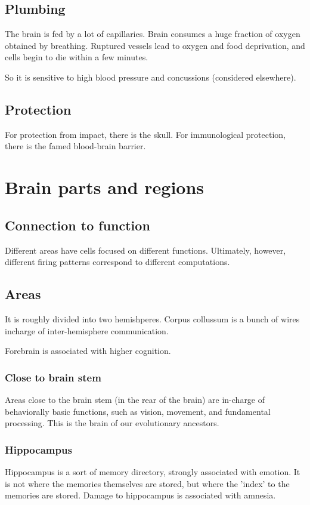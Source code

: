 \documentclass[oneside, article]{memoir}
\begin{document}
\subsection{Plumbing}
The brain is fed by a lot of capillaries.  Brain consumes a huge fraction of oxygen obtained by breathing. Ruptured vessels lead to oxygen and food deprivation, and cells begin to die within a few minutes.

So it is sensitive to high blood pressure and concussions (considered elsewhere). 

\subsection{Protection}
For protection from impact, there is the skull. For immunological protection, there is the famed blood-brain barrier.

\section{Brain parts and regions}
\subsection{Connection to function}
Different areas have cells focused on different functions. Ultimately, however, different firing patterns correspond to different computations.

\subsection{Areas}
It is roughly divided into two hemishperes. 
Corpus collussum is a bunch of wires incharge of inter-hemisphere communication.

Forebrain is associated with higher cognition.

\subsubsection{Close to brain stem}
Areas close to the brain stem (in the rear of the brain) are in-charge of behaviorally basic functions, such as vision, movement, and fundamental processing. This is the brain of our evolutionary ancestors.

\subsubsection{Hippocampus}
Hippocampus is a sort of memory directory, strongly associated with emotion. It is not where the memories themselves are stored, but where the 'index' to the memories are stored. Damage to hippocampus is associated with amnesia.
\end{document}
